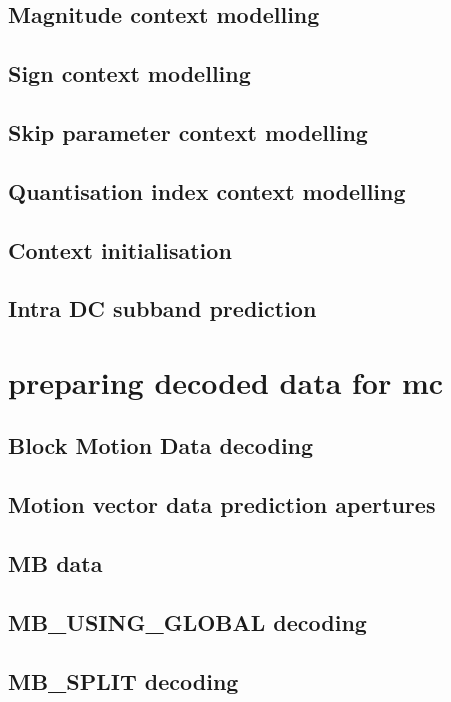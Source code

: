 \subsection{Magnitude context modelling}
\subsection{Sign context modelling}
\subsection{Skip parameter context modelling}
\subsection{Quantisation index context modelling}
\subsection{Context initialisation}
\subsection{Intra DC subband prediction}

\clearpage
\section{preparing decoded data for mc}
\subsection{Block Motion Data decoding}
\subsection{Motion vector data prediction apertures}
\subsection{MB data}
\subsection{MB\_USING\_GLOBAL decoding}
\subsection{MB\_SPLIT decoding}
